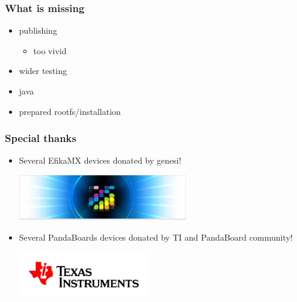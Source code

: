 \documentclass{beamer}
\begin{document}
\begin{frame}[t]
\frametitle{What is missing}
\begin{itemize}
   \item publishing
   \begin{itemize}
   	\item too vivid
   \end{itemize}
   \item wider testing
   \item java
   \item prepared rootfs/installation
\end{itemize}
\end{frame}

\begin{frame}[t]
\frametitle{Special thanks}
\begin{itemize}
   \item Several EfikaMX devices donated by genesi!
   \begin{center}
   \includegraphics[height=2cm]{genesi.jpg}
   \end{center}
   \item Several PandaBoards devices donated by TI and PandaBoard community!
   \begin{center}
   \includegraphics[height=2cm]{ti.jpg}
   \end{center}
\end{itemize}
\end{frame}
\end{document}
